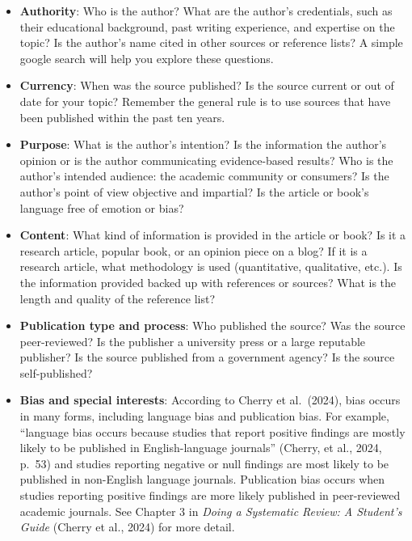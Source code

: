 \documentclass[
  letterpaper,
  DIV=11,
  numbers=noendperiod]{scrreprt}
\providecommand{\tightlist}{%
  \setlength{\itemsep}{0pt}\setlength{\parskip}{0pt}}\usepackage{longtable,booktabs,array}
\begin{document}
\begin{itemize}
\tightlist
\item
  \textbf{Authority}: Who is the author? What are the author's
  credentials, such as their educational background, past writing
  experience, and expertise on the topic? Is the author's name cited in
  other sources or reference lists? A simple google search will help you
  explore these questions.
\item
  \textbf{Currency}: When was the source published? Is the source
  current or out of date for your topic? Remember the general rule is to
  use sources that have been published within the past ten years.
\item
  \textbf{Purpose}: What is the author's intention? Is the information
  the author's opinion or is the author communicating evidence-based
  results? Who is the author's intended audience: the academic community
  or consumers? Is the author's point of view objective and impartial?
  Is the article or book's language free of emotion or bias?
\item
  \textbf{Content}: What kind of information is provided in the article
  or book? Is it a research article, popular book, or an opinion piece
  on a blog? If it is a research article, what methodology is used
  (quantitative, qualitative, etc.). Is the information provided backed
  up with references or sources? What is the length and quality of the
  reference list?
\item
  \textbf{Publication type and process}: Who published the source? Was
  the source peer-reviewed? Is the publisher a university press or a
  large reputable publisher? Is the source published from a government
  agency? Is the source self-published?
\item
  \textbf{Bias and special interests}: According to Cherry et
  al.~(2024), bias occurs in many forms, including language bias and
  publication bias. For example, ``language bias occurs because studies
  that report positive findings are mostly likely to be published in
  English-language journals'' (Cherry, et al., 2024, p.~53) and studies
  reporting negative or null findings are most likely to be published in
  non-English language journals. Publication bias occurs when studies
  reporting positive findings are more likely published in peer-reviewed
  academic journals. See Chapter 3 in \emph{Doing a Systematic Review: A
  Student's Guide} (Cherry et al., 2024) for more detail.
\end{itemize}
\end{document}
